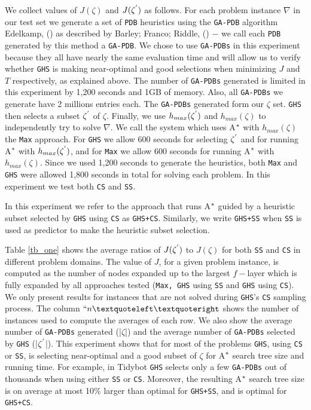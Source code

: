 We collect values of $J(\zeta)$ and $J(\zeta\sp{'})$ as follows. For each problem instance $\nabla$ in our test set we generate a set of \texttt{PDB} heuristics using the \texttt{GA-PDB} algorithm Edelkamp, (\citeyear{edelkamp2007automated}) as described by Barley; Franco; Riddle, (\citeyear{BarleySantiagoOver}) $-$ we call each \texttt{PDB} generated by this method a \texttt{GA-PDB}. We chose to use \texttt{GA-PDBs} in this experiment because they all have nearly the same evaluation time and will allow us to verify whether \texttt{GHS} is making near-optimal and good selections when minimizing $J$ and $T$ respectively, as explained above. The number of \texttt{GA-PDBs} generated is limited in this experiment by 1,200 seconds and 1GB of memory. Also, all \texttt{GA-PDBs} we generate have 2 millions entries each. The \texttt{GA-PDBs} generated form our $\zeta$ set. \texttt{GHS} then selects a subset $\zeta\sp{'}$ of $\zeta$. Finally, we use $h_{max}(\zeta\sp{'})$ and $h_{max}(\zeta)$ to independently try to solve $\nabla$. We call the system which uses A$\sp{*}$ with $h_{max}(\zeta)$ the \texttt{Max} approach. For \texttt{GHS} we allow 600 seconds for selecting $\zeta\sp{'}$ and for running A$\sp{*}$ with $h_{max}(\zeta\sp{'})$, and for \texttt{Max} we allow 600 seconds for running A$\sp{*}$ with $h_{max}(\zeta)$. Since we used 1,200 seconds to generate the heuristics, both \texttt{Max} and \texttt{GHS} were allowed 1,800 seconds in total for solving each problem. In this experiment we test both \texttt{CS} and \texttt{SS}.

In this experiment we refer to the approach that runs A$\sp{*}$ guided by a heuristic subset selected by \texttt{GHS} using \texttt{CS} as \texttt{GHS+CS}. Similarly, we write \texttt{GHS+SS} when \texttt{SS} is used as predictor to make the heuristic subset selection.

Table \ref{tb_one} shows the average ratios of $J(\zeta\sp{'})$ to $J(\zeta)$ for both \texttt{SS} and \texttt{CS} in different problem domains. The value of $J$, for a given problem instance, is computed as the number of nodes expanded up to the largest $f-$layer which is fully expanded by all approaches tested (\texttt{Max, GHS} using \texttt{SS} and \texttt{GHS} using \texttt{CS}). We only present results for instances that are not solved during \texttt{GHS}'s \texttt{CS} sampling process. The column $``n‘’$ shows the number of instances used to compute the averages of each row. We also show the average number of \texttt{GA-PDBs} generated (|$\zeta$|) and the average number of \texttt{GA-PDBs} selected by \texttt{GHS} (|$\zeta\sp{'}$|). This experiment shows that for most of the problems \texttt{GHS}, using \texttt{CS} or \texttt{SS}, is selecting near-optimal and a good subset of $\zeta$ for A$\sp{*}$ search tree size and running time. For example, in Tidybot \texttt{GHS} selects only a few \texttt{GA-PDBs} out of thousands when using either \texttt{SS} or \texttt{CS}. Moreover, the resulting A$\sp{*}$ search tree size is on average at most 10$\%$ larger than optimal for \texttt{GHS+SS}, and is optimal for \texttt{GHS+CS}.

